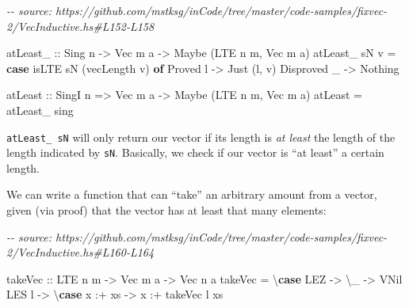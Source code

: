 \documentclass[]{article}
\newenvironment{Shaded}{}{}
\newcommand{\CommentTok}[1]{\textcolor[rgb]{0.38,0.63,0.69}{\textit{#1}}}
\newcommand{\DataTypeTok}[1]{\textcolor[rgb]{0.56,0.13,0.00}{#1}}
\newcommand{\KeywordTok}[1]{\textcolor[rgb]{0.00,0.44,0.13}{\textbf{#1}}}
\newcommand{\NormalTok}[1]{#1}
\newcommand{\OperatorTok}[1]{\textcolor[rgb]{0.40,0.40,0.40}{#1}}
\newcommand{\OtherTok}[1]{\textcolor[rgb]{0.00,0.44,0.13}{#1}}
\begin{document}
\begin{Shaded}
\begin{Highlighting}[]
\CommentTok{{-}{-} source: https://github.com/mstksg/inCode/tree/master/code{-}samples/fixvec{-}2/VecInductive.hs\#L152{-}L158}

\OtherTok{atLeast\_ ::} \DataTypeTok{Sing}\NormalTok{ n }\OtherTok{{-}\textgreater{}} \DataTypeTok{Vec}\NormalTok{ m a }\OtherTok{{-}\textgreater{}} \DataTypeTok{Maybe}\NormalTok{ (}\DataTypeTok{LTE}\NormalTok{ n m, }\DataTypeTok{Vec}\NormalTok{ m a)}
\NormalTok{atLeast\_ sN v }\OtherTok{=} \KeywordTok{case}\NormalTok{ isLTE sN (vecLength v) }\KeywordTok{of}
    \DataTypeTok{Proved}\NormalTok{ l    }\OtherTok{{-}\textgreater{}} \DataTypeTok{Just}\NormalTok{ (l, v)}
    \DataTypeTok{Disproved}\NormalTok{ \_ }\OtherTok{{-}\textgreater{}} \DataTypeTok{Nothing}

\OtherTok{atLeast ::} \DataTypeTok{SingI}\NormalTok{ n }\OtherTok{=\textgreater{}} \DataTypeTok{Vec}\NormalTok{ m a }\OtherTok{{-}\textgreater{}} \DataTypeTok{Maybe}\NormalTok{ (}\DataTypeTok{LTE}\NormalTok{ n m, }\DataTypeTok{Vec}\NormalTok{ m a)}
\NormalTok{atLeast }\OtherTok{=}\NormalTok{ atLeast\_ sing}
\end{Highlighting}
\end{Shaded}

\texttt{atLeast\_\ sN} will only return our vector if its length is \emph{at
least} the length of the length indicated by \texttt{sN}. Basically, we check if
our vector is ``at least'' a certain length.

We can write a function that can ``take'' an arbitrary amount from a vector,
given (via proof) that the vector has at least that many elements:

\begin{Shaded}
\begin{Highlighting}[]
\CommentTok{{-}{-} source: https://github.com/mstksg/inCode/tree/master/code{-}samples/fixvec{-}2/VecInductive.hs\#L160{-}L164}

\OtherTok{takeVec ::} \DataTypeTok{LTE}\NormalTok{ n m }\OtherTok{{-}\textgreater{}} \DataTypeTok{Vec}\NormalTok{ m a }\OtherTok{{-}\textgreater{}} \DataTypeTok{Vec}\NormalTok{ n a}
\NormalTok{takeVec }\OtherTok{=}\NormalTok{ \textbackslash{}}\KeywordTok{case}
    \DataTypeTok{LEZ}   \OtherTok{{-}\textgreater{}}\NormalTok{ \textbackslash{}\_ }\OtherTok{{-}\textgreater{}} \DataTypeTok{VNil}
    \DataTypeTok{LES}\NormalTok{ l }\OtherTok{{-}\textgreater{}}\NormalTok{ \textbackslash{}}\KeywordTok{case}
\NormalTok{      x }\OperatorTok{:+}\NormalTok{ xs }\OtherTok{{-}\textgreater{}}\NormalTok{ x }\OperatorTok{:+}\NormalTok{ takeVec l xs}
\end{Highlighting}
\end{Shaded}
\end{document}
